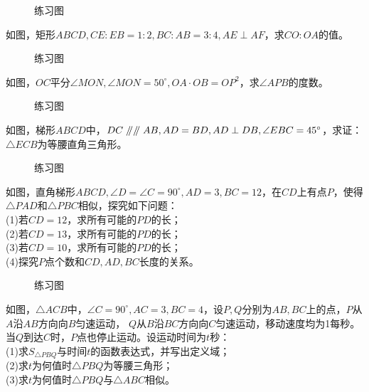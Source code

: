 \begin{figure}[H]
    \centering
    \resizebox{4cm}{!}{}
    \caption{练习图}
\end{figure}
\begin{problem}
如图，矩形$ABCD,CE:EB=1:2,BC:AB=3:4,AE\perp AF$，求$CO:OA$的值。
\end{problem}
\begin{figure}[H]
    \centering
    \resizebox{4cm}{!}{}
    \caption{练习图}
\end{figure}
\begin{problem}
如图，$OC$平分$\angle MON,\angle MON=50^\circ,OA·OB=OP^2$，求$\angle APB$的度数。
\end{problem}
\begin{figure}[H]
    \centering
    \resizebox{4cm}{!}{}
    \caption{练习图}
\end{figure}
\begin{problem}
如图，梯形$ABCD$中，$DC\mathrel{/\mkern-5mu/} \mathrel{/\mkern-5mu/} AB,AD=BD,AD\perp DB,\angle EBC=45^\circ$，求证：$\triangle ECB$为等腰直角三角形。
\end{problem}
\begin{figure}[H]
    \centering
    \resizebox{4cm}{!}{}
    \caption{练习图}
\end{figure}
\begin{problem}
如图，直角梯形$ABCD,\angle D=\angle C=90^\circ,AD=3,BC=12$，在$CD$上有点$P$，使得$\triangle PAD$和$\triangle PBC$相似，探究如下问题：\\
(1)若$CD=12$，求所有可能的$PD$的长； \\
(2)若$CD=13$，求所有可能的$PD$的长； \\
(3)若$CD=10$，求所有可能的$PD$的长； \\
(4)探究$P$点个数和$CD,AD,BC$长度的关系。
\end{problem}
\begin{figure}[H]
    \centering
    \resizebox{4cm}{!}{}
    \caption{练习图}
\end{figure}
\begin{problem}
如图，$\triangle ACB$中，$\angle C=90^\circ,AC=3,BC=4$，设$P,Q$分别为$AB,BC$上的点，$P$从$A$沿$AB$方向向$B$匀速运动，
$Q$从$B$沿$BC$方向向$C$匀速运动，移动速度均为1每秒。当$Q$到达$C$时，$P$点也停止运动。设运动时间为$t$秒：\\
(1)求$S_{\triangle PBQ}$与时间$t$的函数表达式，并写出定义域；\\
(2)求$t$为何值时$\triangle PBQ$为等腰三角形；\\
(3)求$t$为何值时$\triangle PBQ$与$\triangle ABC$相似。
\end{problem}
